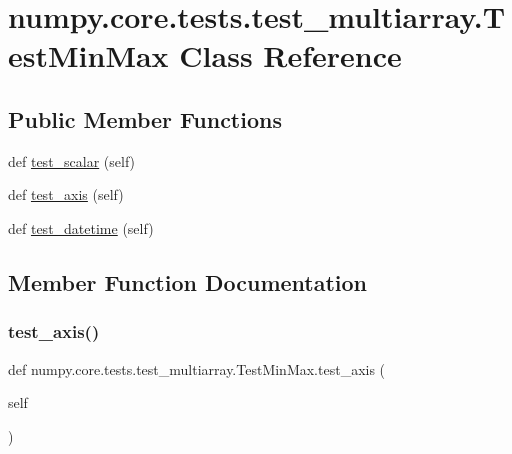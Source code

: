 \hypertarget{classnumpy_1_1core_1_1tests_1_1test__multiarray_1_1TestMinMax}{}\section{numpy.\+core.\+tests.\+test\+\_\+multiarray.\+Test\+Min\+Max Class Reference}
\label{classnumpy_1_1core_1_1tests_1_1test__multiarray_1_1TestMinMax}
\subsection*{Public Member Functions}
\begin{DoxyCompactItemize}
\item 
def \hyperlink{classnumpy_1_1core_1_1tests_1_1test__multiarray_1_1TestMinMax_a33c251da55b8175693bed1fd90eb0b25}{test\+\_\+scalar} (self)
\item 
def \hyperlink{classnumpy_1_1core_1_1tests_1_1test__multiarray_1_1TestMinMax_a557bc0810a5e1b9157b5c14f83e45610}{test\+\_\+axis} (self)
\item 
def \hyperlink{classnumpy_1_1core_1_1tests_1_1test__multiarray_1_1TestMinMax_a3a658c3a6b466e25036253756bb8f0fa}{test\+\_\+datetime} (self)
\end{DoxyCompactItemize}


\subsection{Member Function Documentation}
\mbox{\label{classnumpy_1_1core_1_1tests_1_1test__multiarray_1_1TestMinMax_a557bc0810a5e1b9157b5c14f83e45610}} 
\subsubsection{\texorpdfstring{test\+\_\+axis()}{test\_axis()}}
{\footnotesize\ttfamily def numpy.\+core.\+tests.\+test\+\_\+multiarray.\+Test\+Min\+Max.\+test\+\_\+axis (\begin{DoxyParamCaption}\item[{}]{self }\end{DoxyParamCaption})}

